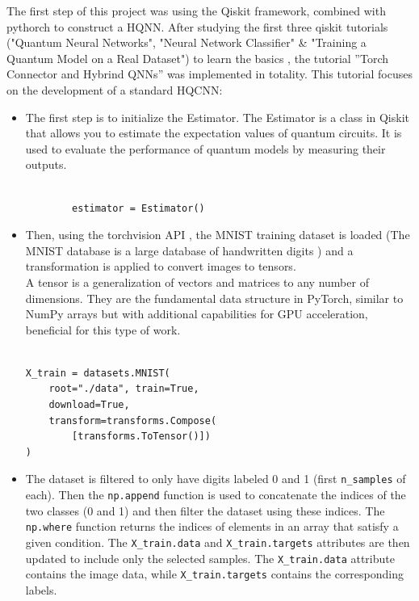 \documentclass[conference]{IEEEtran}
\begin{document}
\noindent
The first step of this project was using the Qiskit framework, combined with pythorch to construct a HQNN.
After studying the first three qiskit tutorials ("Quantum Neural Networks", "Neural Network Classifier" \& "Training a Quantum Model on a Real Dataset") to learn the basics , the tutorial ”Torch
Connector and Hybrind QNNs” \cite{qiskit_torch_connector_tutorial} was implemented in totality.
This tutorial focuses on the development of a standard HQCNN:
\begin{itemize}
    \item The first step is to initialize the Estimator. The Estimator is a class in Qiskit that allows you to estimate the expectation values of quantum circuits. It is used to evaluate the performance of quantum models by measuring their outputs.
        {\small
        \begin{verbatim}

        estimator = Estimator()

        \end{verbatim}
        }
    \item Then, using the torchvision API \cite{paszke2019pytorch}, the MNIST training dataset is loaded (The MNIST database is a large database of handwritten digits \cite{lecun2010mnist}) and a transformation is applied to convert images to tensors.\\
        A tensor is a generalization of vectors and matrices to any number of dimensions. They are the fundamental data structure in PyTorch, similar to NumPy arrays but with additional capabilities for GPU acceleration, beneficial for this type of work.
        
{\raggedright
\small
\begin{verbatim}

X_train = datasets.MNIST(
    root="./data", train=True,
    download=True, 
    transform=transforms.Compose(
        [transforms.ToTensor()])
)

\end{verbatim}
}
    \item The dataset is filtered to only have digits labeled 0 and 1 (first \texttt{n\_samples} of each).
        Then the \texttt{np.append} function is used to concatenate the indices of the two classes (0 and 1) and then filter the dataset using these indices. The \texttt{np.where} function returns the indices of elements in an array that satisfy a given condition.
        The \texttt{X\_train.data} and \texttt{X\_train.targets} attributes are then updated to include only the selected samples.
        The \texttt{X\_train.data} attribute contains the image data, while \texttt{X\_train.targets} contains the corresponding labels.\\



\end{itemize}
\end{document}
